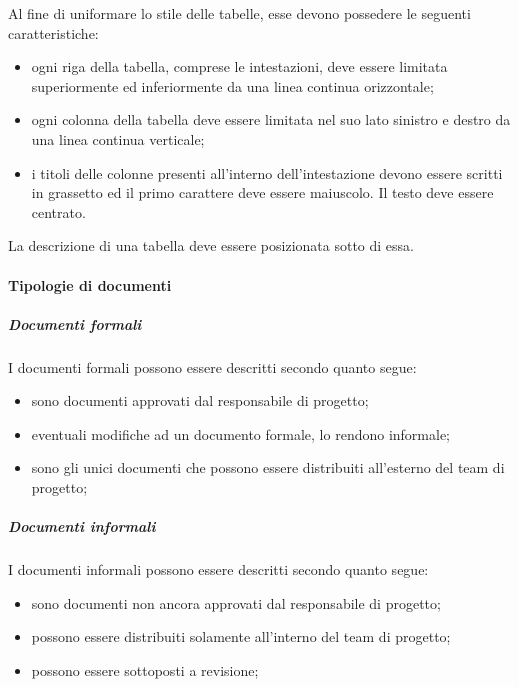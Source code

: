 \documentclass[../NormeProgetto.tex]{subfiles}
\begin{document}
			Al fine di uniformare lo stile delle tabelle, esse devono possedere le seguenti caratteristiche:
			\begin{itemize}
				\item ogni riga della tabella, comprese le intestazioni, deve essere limitata superiormente ed inferiormente da una linea continua orizzontale;
				\item ogni colonna della tabella deve essere limitata nel suo lato sinistro e destro da una linea continua verticale;
				\item i titoli delle colonne presenti all'interno dell'intestazione devono essere scritti in grassetto ed il primo carattere deve essere maiuscolo. Il testo deve essere centrato.
			\end{itemize}
			La descrizione di una tabella deve essere posizionata sotto di essa.		
			
	\paragraph{Tipologie di documenti}
		\subparagraph{Documenti formali}
		I documenti formali possono essere descritti secondo quanto segue:
		\begin{itemize}
			\item sono documenti approvati dal responsabile di progetto;
			\item eventuali modifiche ad un documento formale, lo rendono informale;
			\item sono gli unici documenti che possono essere distribuiti all'esterno del team di progetto;
		\end{itemize}
		
		\subparagraph{Documenti informali}
		I documenti informali possono essere descritti secondo quanto segue:
		\begin{itemize}
			\item sono documenti non ancora approvati dal responsabile di progetto;
			\item possono essere distribuiti solamente all'interno del team di progetto;
			\item possono essere sottoposti a revisione; 
		\end{itemize}
		
\end{document}
